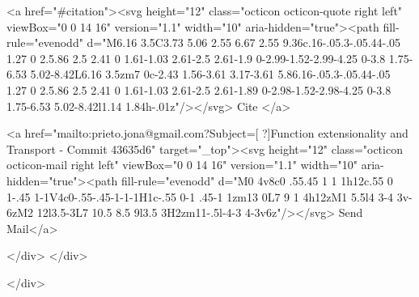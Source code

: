       <a  href="#citation"><svg height="12" class="octicon octicon-quote right left" viewBox="0 0 14 16" version="1.1" width="10" aria-hidden="true"><path fill-rule="evenodd" d="M6.16 3.5C3.73 5.06 2.55 6.67 2.55 9.36c.16-.05.3-.05.44-.05 1.27 0 2.5.86 2.5 2.41 0 1.61-1.03 2.61-2.5 2.61-1.9 0-2.99-1.52-2.99-4.25 0-3.8 1.75-6.53 5.02-8.42L6.16 3.5zm7 0c-2.43 1.56-3.61 3.17-3.61 5.86.16-.05.3-.05.44-.05 1.27 0 2.5.86 2.5 2.41 0 1.61-1.03 2.61-2.5 2.61-1.89 0-2.98-1.52-2.98-4.25 0-3.8 1.75-6.53 5.02-8.42l1.14 1.84h-.01z"/></svg> Cite
      </a>

      <a href="mailto:prieto.jona@gmail.com?Subject=[ ?]Function extensionality and Transport - Commit 43635d6" target="_top"><svg height="12" class="octicon octicon-mail right left" viewBox="0 0 14 16" version="1.1" width="10" aria-hidden="true"><path fill-rule="evenodd" d="M0 4v8c0 .55.45 1 1 1h12c.55 0 1-.45 1-1V4c0-.55-.45-1-1-1H1c-.55 0-1 .45-1 1zm13 0L7 9 1 4h12zM1 5.5l4 3-4 3v-6zM2 12l3.5-3L7 10.5 8.5 9l3.5 3H2zm11-.5l-4-3 4-3v6z"/></svg> Send Mail</a>

    </div>
  </div>

</div>




